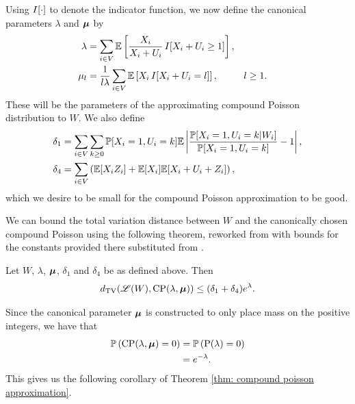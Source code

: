 	Using $I[\cdot]$ to denote the indicator function, we now define the canonical parameters $\lambda$ and ${\bm{{\mu}}}$ by
	\begin{align}
		\lambda &= \sum_{i \in V} \mathbb{E}\left[\frac{X_i}{X_i + U_i} \, I[ X_i + U_i \geq 1] \right],\\
		\mu_l &= \frac{1}{l \lambda} \sum_{i \in V} \mathbb{E}\left[ X_i \, I[X_i + U_i = l] \right], && l\geq 1.
		\label{eq:mu definition}
	\end{align}
	These will be the parameters of the approximating compound Poisson distribution to $W$. We also define
	\begin{align}
		\delta_1 &= \sum_{i \in V}  \sum_{k \geq 0} \mathbb{P}[X_i = 1, U_i = k] \mathbb{E} \left|\frac{\mathbb{P}[X_i = 1, U_i = k|W_i]}{\mathbb{P}[X_i = 1, U_i = k]} - 1 \right|, \label{eq:delta_1 definition}\\ 
		\delta_4 &= \sum_{i \in V} \left( \mathbb{E}[X_i Z_i] + \mathbb{E}[X_i] \mathbb{E}[X_i + U_i + Z_i] \right), \label{eq:delta_4 definition}
	\end{align}
	which we desire to be small for the compound Poisson approximation to be good.

	We can bound the total variation distance between $W$ and the canonically chosen compound Poisson using the following theorem, reworked from \cite[CPA 1A]{Barbour2001-nh} with bounds for the constants provided there substituted from \cite[Equation 2.17]{Barbour2001-nh}.

	\begin{theorem}
	\label{thm: compound poisson approximation}
		Let $W$, $\lambda$, ${\bm{{\mu}}}$, $\delta_1$ and $\delta_4$ be as defined above. Then
		\begin{equation}
			d_{\mathrm{TV}}(\mathscr{L}(W), \mathrm{CP}(\lambda, {\bm{{\mu}}})) \leq (\delta_1 + \delta_4)e^\lambda.
		\end{equation}
	\end{theorem}

	Since the canonical parameter ${\bm{{\mu}}}$ is constructed to only place mass on the positive integers, we have that
	\begin{align}
		\mathbb{P}\left(\mathrm{CP}(\lambda, {\bm{{\mu}}}) = 0\right) &= \mathbb{P}\left(\mathrm{P}(\lambda) = 0 \right) \\
		&= e^{-\lambda}.
	\end{align}
	This gives us the following corollary of Theorem \ref{thm: compound poisson approximation}.

